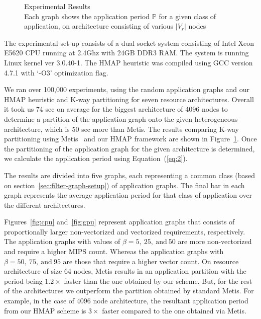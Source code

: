 \begin{figure}[ht!]
{    \label{fig:overall}
  }
  \caption{Experimental Results\\ \footnotesize{Each graph shows the
  application period $\mathbb{P}$ for a given class of application, on
  architecture consisting of various $|V_r|$ nodes}}
  \label{fig:exp-res}
\end{figure}

The experimental set-up consists of a dual socket system consisting of
Intel Xeon E5620 CPU running at 2.4Ghz with 24GB DDR3 RAM. The system
is running Linux kernel ver 3.0.40-1. The HMAP heuristic was compiled
using GCC version 4.7.1 with `-O3' optimization flag.

We ran over 100,000 experiments, using the random application graphs and
our HMAP heuristic and K-way partitioning for seven resource architectures.
Overall it took us 74 sec on average for the biggest architecture of 4096
nodes to determine a partition of the application graph onto the given
heterogeneous architecture, which is 50 sec more than Metis.
The results comparing K-way partitioning using Metis~\cite{gkar95} and our HMAP
framework are shown in Figure~\ref{fig:exp-res}. Once the partitioning of the
application graph for the given architecture is determined, we calculate the
application period using Equation~(\ref{eq:2}).

The results are divided into five graphs, each representing a common
class (based on section~\ref{sec:filter-graph-setup}) of application
graphs. The final bar in each graph represents the average application period
for that class of application over the different architectures.

Figures~\ref{fig:cpu} and~\ref{fig:gpu} represent application graphs
that consists of proportionally larger non-vectorized and vectorized
requirements, respectively. The application graphs with values of $\beta = 5,\ 25,\
\mathrm{and}\ 50$ are more non-vectorized and require a higher MIPS
count. Whereas the application graphs with $\beta = 50,\ 75,\ \mathrm{and}\ 95$ are
those that require a higher vector count. On resource architecture of size 64
nodes, Metis results in an application partition with the period being
$1.2\times$ faster than the one obtained by our scheme. But, for the
rest of the architectures we outperform the partition obtained by
standard Metis. For example, in the case of 4096 node architecture, the
resultant application period from our HMAP scheme is $3\times$ faster
compared to the one obtained via Metis.



